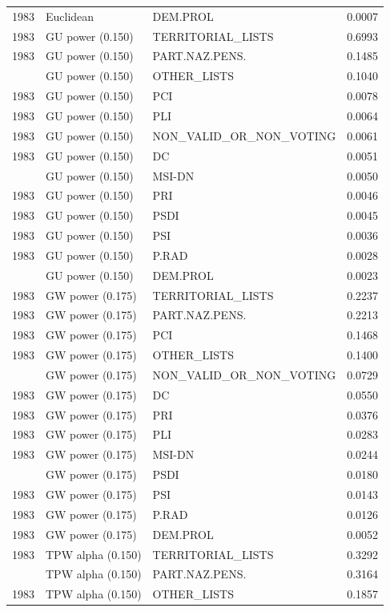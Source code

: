 \begin{longtable}[t]{rllr}
1983 & Euclidean & DEM.PROL & 0.0007\\
1983 & GU power (0.150) & TERRITORIAL\_LISTS & 0.6993\\
1983 & GU power (0.150) & PART.NAZ.PENS. & 0.1485\\
\addlinespace
1983 & GU power (0.150) & OTHER\_LISTS & 0.1040\\
1983 & GU power (0.150) & PCI & 0.0078\\
1983 & GU power (0.150) & PLI & 0.0064\\
1983 & GU power (0.150) & NON\_VALID\_OR\_NON\_VOTING & 0.0061\\
1983 & GU power (0.150) & DC & 0.0051\\
\addlinespace
1983 & GU power (0.150) & MSI-DN & 0.0050\\
1983 & GU power (0.150) & PRI & 0.0046\\
1983 & GU power (0.150) & PSDI & 0.0045\\
1983 & GU power (0.150) & PSI & 0.0036\\
1983 & GU power (0.150) & P.RAD & 0.0028\\
\addlinespace
1983 & GU power (0.150) & DEM.PROL & 0.0023\\
1983 & GW power (0.175) & TERRITORIAL\_LISTS & 0.2237\\
1983 & GW power (0.175) & PART.NAZ.PENS. & 0.2213\\
1983 & GW power (0.175) & PCI & 0.1468\\
1983 & GW power (0.175) & OTHER\_LISTS & 0.1400\\
\addlinespace
1983 & GW power (0.175) & NON\_VALID\_OR\_NON\_VOTING & 0.0729\\
1983 & GW power (0.175) & DC & 0.0550\\
1983 & GW power (0.175) & PRI & 0.0376\\
1983 & GW power (0.175) & PLI & 0.0283\\
1983 & GW power (0.175) & MSI-DN & 0.0244\\
\addlinespace
1983 & GW power (0.175) & PSDI & 0.0180\\
1983 & GW power (0.175) & PSI & 0.0143\\
1983 & GW power (0.175) & P.RAD & 0.0126\\
1983 & GW power (0.175) & DEM.PROL & 0.0052\\
1983 & TPW alpha (0.150) & TERRITORIAL\_LISTS & 0.3292\\
\addlinespace
1983 & TPW alpha (0.150) & PART.NAZ.PENS. & 0.3164\\
1983 & TPW alpha (0.150) & OTHER\_LISTS & 0.1857\\

\end{longtable}
